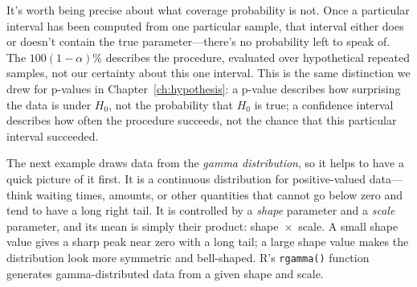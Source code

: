 It's worth being precise about what coverage probability is not. Once a
particular interval has been computed from one particular sample, that
interval either does or doesn't contain the true parameter---there's no
probability left to speak of. The $100(1-\alpha)\%$ describes the
procedure, evaluated over hypothetical repeated samples, not our certainty
about this one interval. This is the same distinction we drew for p-values
in Chapter~\ref{ch:hypothesis}: a p-value describes how surprising the data
is under $H_0$, not the probability that $H_0$ is true; a confidence
interval describes how often the procedure succeeds, not the chance that
this particular interval succeeded.


The next example draws data from the \emph{gamma
distribution}, so it helps to have a quick
picture of it first. It is a continuous distribution for positive-valued
data---think waiting times, amounts, or other quantities that cannot go
below zero and tend to have a long right tail. It is controlled by a
\emph{shape} parameter and a \emph{scale} parameter, and its mean is
simply their product: shape~$\times$~scale. A small shape value gives a
sharp peak near zero with a long tail; a large shape value makes the
distribution look more symmetric and bell-shaped. R's \lstinline{rgamma()}
function generates gamma-distributed data from a given shape and scale.


